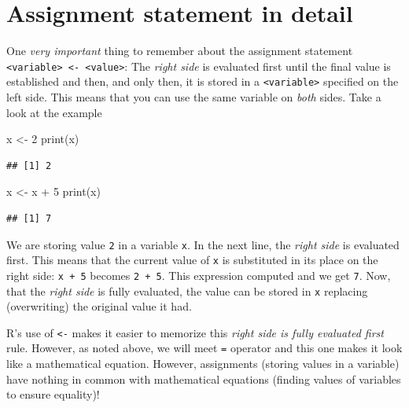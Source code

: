 \documentclass[
]{book}
\newenvironment{Shaded}{\begin{snugshade}}{\end{snugshade}}
\newcommand{\DecValTok}[1]{\textcolor[rgb]{0.00,0.00,0.81}{#1}}
\newcommand{\FunctionTok}[1]{\textcolor[rgb]{0.00,0.00,0.00}{#1}}
\newcommand{\NormalTok}[1]{#1}
\newcommand{\OtherTok}[1]{\textcolor[rgb]{0.56,0.35,0.01}{#1}}
\newcommand{\SpecialCharTok}[1]{\textcolor[rgb]{0.00,0.00,0.00}{#1}}
\begin{document}
\hypertarget{assignment-statement}{%
\section{Assignment statement in detail}\label{assignment-statement}}

One \emph{very important} thing to remember about the assignment statement \texttt{\textless{}variable\textgreater{}\ \textless{}-\ \textless{}value\textgreater{}}: The \emph{right side} is evaluated first until the final value is established and then, and only then, it is stored in a \texttt{\textless{}variable\textgreater{}} specified on the left side. This means that you can use the same variable on \emph{both} sides. Take a look at the example

\begin{Shaded}
\begin{Highlighting}[]
\NormalTok{x }\OtherTok{\textless{}{-}} \DecValTok{2}
\FunctionTok{print}\NormalTok{(x)}
\end{Highlighting}
\end{Shaded}

\begin{verbatim}
## [1] 2
\end{verbatim}

\begin{Shaded}
\begin{Highlighting}[]
\NormalTok{x }\OtherTok{\textless{}{-}}\NormalTok{ x }\SpecialCharTok{+} \DecValTok{5}
\FunctionTok{print}\NormalTok{(x)}
\end{Highlighting}
\end{Shaded}

\begin{verbatim}
## [1] 7
\end{verbatim}

We are storing value \texttt{2} in a variable \texttt{x}. In the next line, the \emph{right side} is evaluated first. This means that the current value of \texttt{x} is substituted in its place on the right side: \texttt{x\ +\ 5} becomes \texttt{2\ +\ 5}. This expression computed and we get \texttt{7}. Now, that the \emph{right side} is fully evaluated, the value can be stored in \texttt{x} replacing (overwriting) the original value it had.

R's use of \texttt{\textless{}-} makes it easier to memorize this \emph{right side is fully evaluated first} rule. However, as noted above, we will meet \texttt{=} operator and this one makes it look like a mathematical equation. However, assignments (storing values in a variable) have nothing in common with mathematical equations (finding values of variables to ensure equality)!
\end{document}
